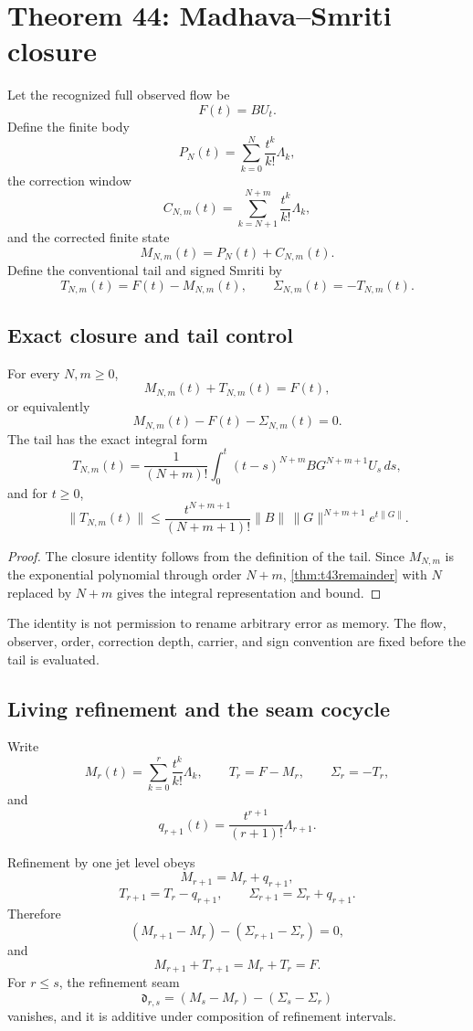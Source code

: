 \section{Theorem 44: Madhava--Smriti closure}

Let the recognized full observed flow be
\[
 F(t)=BU_t.
\]
Define the finite body
\[
 P_N(t)=\sum_{k=0}^N\frac{t^k}{k!}\Lambda_k,
\]
the correction window
\[
 C_{N,m}(t)=\sum_{k=N+1}^{N+m}\frac{t^k}{k!}\Lambda_k,
\]
and the corrected finite state
\[
 M_{N,m}(t)=P_N(t)+C_{N,m}(t).
\]
Define the conventional tail and signed Smriti by
\[
 T_{N,m}(t)=F(t)-M_{N,m}(t),
 \qquad
 \Sigma_{N,m}(t)=-T_{N,m}(t).
\]

\subsection{Exact closure and tail control}

\begin{theorem}\label{thm:t44closure}
For every $N,m\ge0$,
\[
 \boxed{M_{N,m}(t)+T_{N,m}(t)=F(t),}
\]
or equivalently
\[
 M_{N,m}(t)-F(t)-\Sigma_{N,m}(t)=0.
\]
The tail has the exact integral form
\[
 T_{N,m}(t)=\frac1{(N+m)!}
 \int_0^t(t-s)^{N+m}BG^{N+m+1}U_s\,ds,
\]
and for $t\ge0$,
\[
 \|T_{N,m}(t)\|
 \le\frac{t^{N+m+1}}{(N+m+1)!}
 \|B\|\,\|G\|^{N+m+1}e^{t\|G\|}.
\]
\end{theorem}

\begin{proof}
The closure identity follows from the definition of the tail. Since $M_{N,m}$ is the exponential polynomial through order $N+m$, \cref{thm:t43remainder} with $N$ replaced by $N+m$ gives the integral representation and bound.
\end{proof}

The identity is not permission to rename arbitrary error as memory. The flow, observer, order, correction depth, carrier, and sign convention are fixed before the tail is evaluated.

\subsection{Living refinement and the seam cocycle}

Write
\[
 M_r(t)=\sum_{k=0}^r\frac{t^k}{k!}\Lambda_k,
 \qquad
 T_r=F-M_r,
 \qquad
 \Sigma_r=-T_r,
\]
and
\[
 q_{r+1}(t)=\frac{t^{r+1}}{(r+1)!}\Lambda_{r+1}.
\]

\begin{theorem}\label{thm:t44transfer}
Refinement by one jet level obeys
\[
 M_{r+1}=M_r+q_{r+1},
\]
\[
 T_{r+1}=T_r-q_{r+1},
 \qquad
 \Sigma_{r+1}=\Sigma_r+q_{r+1}.
\]
Therefore
\[
 (M_{r+1}-M_r)-(\Sigma_{r+1}-\Sigma_r)=0,
\]
and
\[
 M_{r+1}+T_{r+1}=M_r+T_r=F.
\]
For $r\le s$, the refinement seam
\[
 \mathfrak d_{r,s}=(M_s-M_r)-(\Sigma_s-\Sigma_r)
\]
vanishes, and it is additive under composition of refinement intervals.
\end{theorem}

